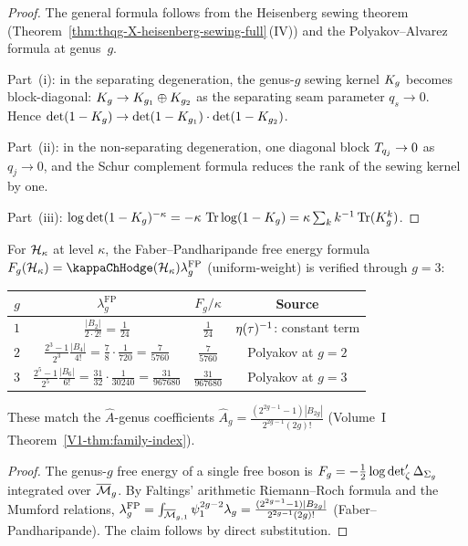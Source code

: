 \begin{proof}
The general formula follows from the Heisenberg sewing theorem
(Theorem~\ref{thm:thqg-X-heisenberg-sewing-full}\,(IV)) and
the Polyakov--Alvarez formula at genus~$g$.

Part~(i): in the separating degeneration, the genus-$g$
sewing kernel $K_g$ becomes block-diagonal:
$K_g \to K_{g_1} \oplus K_{g_2}$
as the separating seam parameter $q_s \to 0$.
Hence $\det(1 - K_g) \to
\det(1 - K_{g_1}) \cdot \det(1 - K_{g_2})$.

Part~(ii): in the non-separating degeneration, one diagonal
block $T_{q_j} \to 0$ as $q_j \to 0$, and the Schur
complement formula reduces the rank of the sewing kernel by one.

Part~(iii): $\log\det(1-K_g)^{-\kappa}
= -\kappa\,\operatorname{Tr}\log(1-K_g)
= \kappa\sum_{k} k^{-1}\operatorname{Tr}(K_g^k)$.
\end{proof}

\begin{proposition}%
%
For $\mathcal{H}_\kappa$ at level $\kappa$, the Faber--Pandharipande
free energy formula
$F_g(\cH_\kappa)=\kappaChHodge(\cH_\kappa)\lambda_g^{\mathrm{FP}}$
\textup{(}uniform-weight\textup{)} is verified
through $g = 3$:
\begin{center}
\begin{tabular}{c|c|c|c}
$g$ & $\lambda_g^{\mathrm{FP}}$ & $F_g/\kappa$ & Source \\
\hline
$1$ & $\frac{|B_2|}{2 \cdot 2!} = \frac{1}{24}$ & $\frac{1}{24}$
& $\eta(\tau)^{-1}$: constant term \\[4pt]
$2$ & $\frac{2^3-1}{2^3}\frac{|B_4|}{4!}
= \frac{7}{8}\cdot\frac{1}{720}
= \frac{7}{5760}$ & $\frac{7}{5760}$
& Polyakov at $g = 2$ \\[4pt]
$3$ & $\frac{2^5-1}{2^5}\frac{|B_6|}{6!}
= \frac{31}{32}\cdot\frac{1}{30240}
= \frac{31}{967680}$ & $\frac{31}{967680}$
& Polyakov at $g = 3$
\end{tabular}
\end{center}
These match the $\hat{A}$-genus coefficients
$\hat{A}_g = \frac{(2^{2g-1}-1)|B_{2g}|}{2^{2g-1}(2g)!}$
(Volume~I Theorem~\textup{\ref{V1-thm:family-index}}).
\end{proposition}

\begin{proof}
The genus-$g$ free energy of a single free boson is
$F_g = -\frac{1}{2}\log\det\nolimits'_\zeta\Delta_{\Sigma_g}$
integrated over $\overline{\mathcal{M}}_g$. By Faltings'
arithmetic Riemann--Roch formula and the Mumford relations,
$\lambda_g^{\mathrm{FP}}
=\int_{\overline{\mathcal{M}}_{g,1}}\psi_1^{2g-2}\lambda_g
= \frac{(2^{2g-1}-1)|B_{2g}|}{2^{2g-1}(2g)!}$
(Faber--Pandharipande). The claim follows by direct substitution.
\end{proof}

